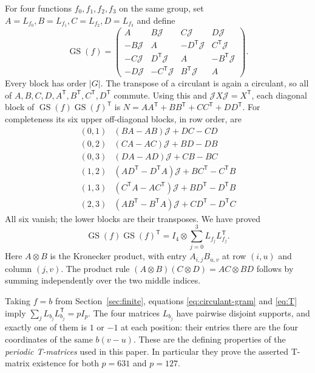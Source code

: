 \documentclass[10pt]{article}
\newcommand{\GS}{\operatorname{GS}}
\begin{document}
For four functions $f_0,f_1,f_2,f_3$ on the same group, set
$A=L_{f_0}, B=L_{f_1}, C=L_{f_2}, D=L_{f_3}$ and define
\begin{equation}\label{eq:GS}
 \GS(f)=\begin{pmatrix}
 A&B\mathcal J&C\mathcal J&D\mathcal J\\
 -B\mathcal J&A&-D^{\mathsf T}\mathcal J&C^{\mathsf T}\mathcal J\\
 -C\mathcal J&D^{\mathsf T}\mathcal J&A&-B^{\mathsf T}\mathcal J\\
 -D\mathcal J&-C^{\mathsf T}\mathcal J&B^{\mathsf T}\mathcal J&A
 \end{pmatrix}.
\end{equation}
Every block has order $|G|$.
The transpose of a circulant is again a circulant, so all of
$A,B,C,D,A^{\mathsf T},B^{\mathsf T},C^{\mathsf T},D^{\mathsf T}$ commute.
Using this and $\mathcal JX\mathcal J=X^{\mathsf T}$, each diagonal block of
$\GS(f)\GS(f)^{\mathsf T}$ is
$N=AA^{\mathsf T}+BB^{\mathsf T}+CC^{\mathsf T}+DD^{\mathsf T}$.
For completeness its six upper off-diagonal blocks, in row order, are
\[
\begin{array}{c|l}
(0,1)&(BA-AB)\mathcal J+DC-CD\\
(0,2)&(CA-AC)\mathcal J+BD-DB\\
(0,3)&(DA-AD)\mathcal J+CB-BC\\
(1,2)&(AD^{\mathsf T}-D^{\mathsf T}A)\mathcal J+BC^{\mathsf T}-C^{\mathsf T}B\\
(1,3)&(C^{\mathsf T}A-AC^{\mathsf T})\mathcal J+BD^{\mathsf T}-D^{\mathsf T}B\\
(2,3)&(AB^{\mathsf T}-B^{\mathsf T}A)\mathcal J+CD^{\mathsf T}-D^{\mathsf T}C
\end{array}
\]
All six vanish; the lower blocks are their transposes. We have proved
\begin{equation}\label{eq:GS-Gram}
 \GS(f)\GS(f)^{\mathsf T}
 =I_4\otimes\sum_{j=0}^3L_{f_j}L_{f_j}^{\mathsf T}.
\end{equation}
Here $A\otimes B$ is the Kronecker product, with entry
$A_{i,j}B_{u,v}$ at row $(i,u)$ and column $(j,v)$.
The product rule $(A\otimes B)(C\otimes D)=AC\otimes BD$ follows by
summing independently over the two middle indices.

Taking $f=b$ from Section~\ref{sec:finite}, equations
\eqref{eq:circulant-gram} and \eqref{eq:T} imply
$\sum_jL_{b_j}L_{b_j}^{\mathsf T}=pI_p$.
The four matrices $L_{b_j}$ have pairwise disjoint supports, and exactly
one of them is $1$ or $-1$ at each position: their entries there are the
four coordinates of the same $b(v-u)$.
These are the defining properties of the \emph{periodic T-matrices}
used in this paper. In particular they prove the asserted T-matrix
existence for both $p=631$ and $p=127$.
\end{document}
